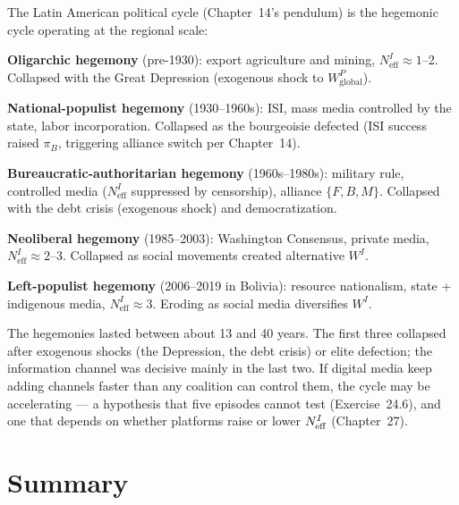 \documentclass[../structural_economics_book.tex]{subfiles}
\begin{document}
\begin{intuition}
The Latin American political cycle (Chapter~14's pendulum) is the hegemonic cycle operating at the regional scale:

\textbf{Oligarchic hegemony} (pre-1930): export agriculture and mining, $N_{\text{eff}}^I \approx 1$--2. Collapsed with the Great Depression (exogenous shock to $W^P_{\text{global}}$).

\textbf{National-populist hegemony} (1930--1960s): ISI, mass media controlled by the state, labor incorporation. Collapsed as the bourgeoisie defected (ISI success raised $\pi_B$, triggering alliance switch per Chapter~14).

\textbf{Bureaucratic-authoritarian hegemony} (1960s--1980s): military rule, controlled media ($N_{\text{eff}}^I$ suppressed by censorship), alliance $\{F, B, M\}$. Collapsed with the debt crisis (exogenous shock) and democratization.

\textbf{Neoliberal hegemony} (1985--2003): Washington Consensus, private media, $N_{\text{eff}}^I \approx 2$--3. Collapsed as social movements created alternative $W^I$.

\textbf{Left-populist hegemony} (2006--2019 in Bolivia): resource nationalism, state + indigenous media, $N_{\text{eff}}^I \approx 3$. Eroding as social media diversifies $W^I$.

The hegemonies lasted between about 13 and 40 years. The first three collapsed after exogenous shocks (the Depression, the debt crisis) or elite defection; the information channel was decisive mainly in the last two. If digital media keep adding channels faster than any coalition can control them, the cycle may be accelerating --- a hypothesis that five episodes cannot test (Exercise~24.6), and one that depends on whether platforms raise or lower $N_{\text{eff}}^I$ (Chapter~27).
\end{intuition}


\section{Summary}
\label{ch24:sec:summary}
\end{document}
